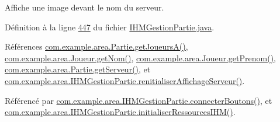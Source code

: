 Affiche une image devant le nom du serveur. 



Définition à la ligne \hyperlink{_i_h_m_gestion_partie_8java_source_l00447}{447} du fichier \hyperlink{_i_h_m_gestion_partie_8java_source}{I\+H\+M\+Gestion\+Partie.\+java}.



Références \hyperlink{_partie_8java_source_l00064}{com.\+example.\+area.\+Partie.\+get\+Joueurs\+A()}, \hyperlink{_joueur_8java_source_l00039}{com.\+example.\+area.\+Joueur.\+get\+Nom()}, \hyperlink{_joueur_8java_source_l00047}{com.\+example.\+area.\+Joueur.\+get\+Prenom()}, \hyperlink{_partie_8java_source_l00334}{com.\+example.\+area.\+Partie.\+get\+Serveur()}, et \hyperlink{_i_h_m_gestion_partie_8java_source_l00475}{com.\+example.\+area.\+I\+H\+M\+Gestion\+Partie.\+renitialiser\+Affichage\+Serveur()}.



Référencé par \hyperlink{_i_h_m_gestion_partie_8java_source_l00346}{com.\+example.\+area.\+I\+H\+M\+Gestion\+Partie.\+connecter\+Boutons()}, et \hyperlink{_i_h_m_gestion_partie_8java_source_l00223}{com.\+example.\+area.\+I\+H\+M\+Gestion\+Partie.\+initialiser\+Ressources\+I\+H\+M()}.


